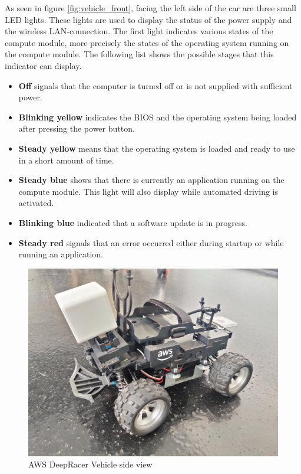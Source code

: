 As seen in figure \ref{fig:vehicle_front}, facing the left side of the car are three small LED lights. These lights are used to display the status of the power supply and the wireless LAN-connection. The first light indicates various states of the compute module, more precisely the states of the operating system running on the compute module. The following list shows the possible stages that this indicator can display.
\begin{itemize}
    \item \textbf{Off} signals that the computer is turned off or is not supplied with sufficient power.
    \item \textbf{Blinking yellow} indicates the BIOS and the operating system being loaded after pressing the power button.
    \item \textbf{Steady yellow} means that the operating system is loaded and ready to use in a short amount of time.
    \item \textbf{Steady blue} shows that there is currently an application running on the compute module. This  light will also display while automated driving is activated.
    \item \textbf{Blinking blue} indicated that a software update is in progress.
    \item \textbf{Steady red} signals that an error occurred either during startup or while running an application.
\end{itemize}

\begin{figure}
    \centering
    \includegraphics[width=.85\textwidth]{images/IMG_20201117_091128.jpg}
    \caption{AWS DeepRacer Vehicle side view}
    \label{fig:vehicle_side}
\end{figure}

